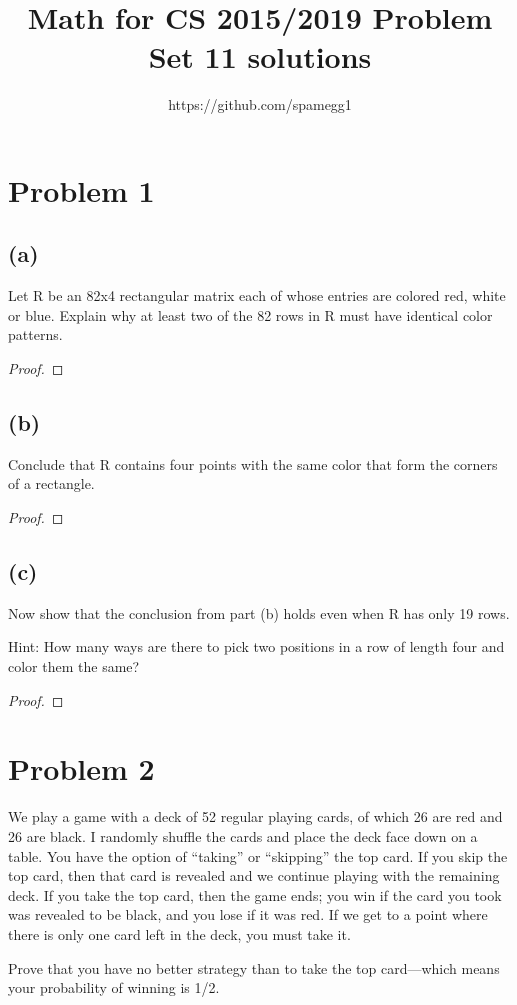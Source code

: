 \documentclass[14pt]{extarticle}
\title{Math for CS 2015/2019 Problem Set 11 solutions}
\author{https://github.com/spamegg1}
\begin{document}
\maketitle
\tableofcontents

\section{Problem 1}
\subsection{(a)}
Let R be an 82x4 rectangular matrix each of whose entries are colored red, white or blue. Explain why at least two of the 82 rows in R must have identical color patterns.
\begin{proof}
\end{proof}
\subsection{(b)}
Conclude that R contains four points with the same color that form the corners of a rectangle.
\begin{proof}
\end{proof}
\subsection{(c)}
Now show that the conclusion from part (b) holds even when R has only 19 rows.

Hint: How many ways are there to pick two positions in a row of length four and color them the same?
\begin{proof}
\end{proof}

\section{Problem 2}
We play a game with a deck of 52 regular playing cards, of which 26 are red and 26 are black. I randomly shuffle the cards and place the deck face down on a table. You have the option of “taking” or “skipping”
the top card. If you skip the top card, then that card is revealed and we continue playing with the remaining deck. If you take the top card, then the game ends; you win if the card you took was revealed to be black, and you lose if it was red. If we get to a point where there is only one card left in the deck, you must take it.

Prove that you have no better strategy than to take the top card—which means your probability of winning is 1/2.
\end{document}
